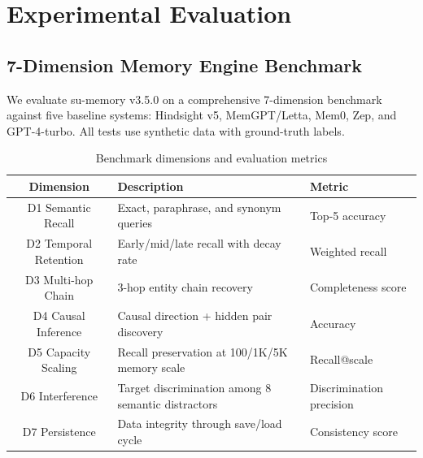 \documentclass[11pt,a4paper]{article}
\begin{document}
\section{Experimental Evaluation}
\label{sec:experiments}

\subsection{7-Dimension Memory Engine Benchmark}

We evaluate su-memory v3.5.0 on a comprehensive 7-dimension benchmark against five baseline systems: Hindsight v5, MemGPT/Letta, Mem0, Zep, and GPT-4-turbo. All tests use synthetic data with ground-truth labels.

\begin{table}[H]
\centering
\caption{Benchmark dimensions and evaluation metrics}
\label{tab:dimensions}
\begin{tabular}{cll}
\toprule
\textbf{Dimension} & \textbf{Description} & \textbf{Metric} \\
\midrule
D1 Semantic Recall    & Exact, paraphrase, and synonym queries               & Top-5 accuracy \\
D2 Temporal Retention & Early/mid/late recall with decay rate                 & Weighted recall \\
D3 Multi-hop Chain    & 3-hop entity chain recovery                           & Completeness score \\
D4 Causal Inference   & Causal direction + hidden pair discovery              & Accuracy \\
D5 Capacity Scaling   & Recall preservation at 100/1K/5K memory scale         & Recall@scale \\
D6 Interference       & Target discrimination among 8 semantic distractors    & Discrimination precision \\
D7 Persistence        & Data integrity through save/load cycle                & Consistency score \\
\bottomrule
\end{tabular}
\end{table}
\end{document}
